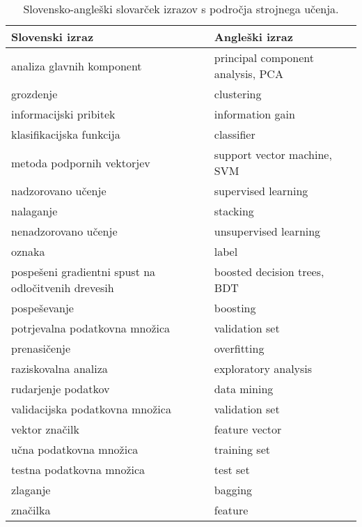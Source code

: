 \begin{table}[ht]
	\centering
	\begin{tabular}{ll}
		\hline
		\textbf{Slovenski izraz} & \textbf{Angleški izraz} \\
		\hline
		analiza glavnih komponent & principal component analysis, PCA \\
		grozdenje & clustering \\
		informacijski pribitek & information gain \\
		klasifikacijska funkcija & classifier \\
		metoda podpornih vektorjev & support vector machine, SVM \\
		nadzorovano učenje & supervised learning \\
		nalaganje & stacking \\
		nenadzorovano učenje & unsupervised learning \\
		oznaka & label \\
		pospešeni gradientni spust na odločitvenih drevesih & boosted decision trees, BDT \\
		pospeševanje & boosting \\
		potrjevalna podatkovna množica & validation set \\
		prenasičenje & overfitting \\
		raziskovalna analiza & exploratory analysis \\
		rudarjenje podatkov & data mining \\
		validacijska podatkovna množica & validation set \\
		vektor značilk & feature vector \\
		učna podatkovna množica & training set \\	
		testna podatkovna množica & test set \\
		zlaganje & bagging \\	
		značilka & feature \\
	\end{tabular}
	\caption{Slovensko-angleški slovarček izrazov s področja strojnega učenja.}
	\label{slovar}
\end{table}

